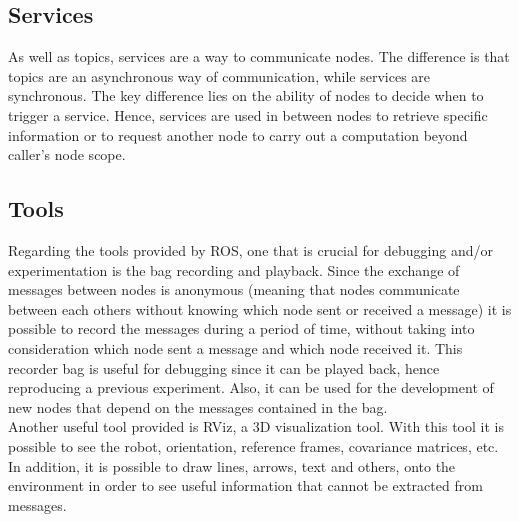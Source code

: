 \subsection{Services}
\label{subsec:chapter1:ros:services}
As well as topics, services are a way to communicate nodes. The difference is that topics are an asynchronous way of communication, while services are synchronous. The key difference lies on the ability of nodes to decide when to trigger a service. Hence, services are used in between nodes to retrieve specific information or to request another node to carry out a computation beyond caller's node scope.


\subsection{Tools}
\label{subsec:chapter1:ros:tools}
Regarding the tools provided by ROS, one that is crucial for debugging and/or experimentation is the bag recording and playback. Since the exchange of messages between nodes is anonymous (meaning that nodes communicate between each others without knowing which node sent or received a message) it is possible to record the messages during a period of time, without taking into consideration which node sent a message and which node received it. This recorder bag is useful for debugging since it can be played back, hence reproducing a previous experiment. Also, it can be used for the development of new nodes that depend on the messages contained in the bag.\\

Another useful tool provided is \ac{RViz}, a 3D visualization tool. With this tool it is possible to see the robot, orientation, reference frames, covariance matrices, etc. In addition, it is possible to draw lines, arrows, text and others, onto the environment in order to see useful information that cannot be extracted from messages.


